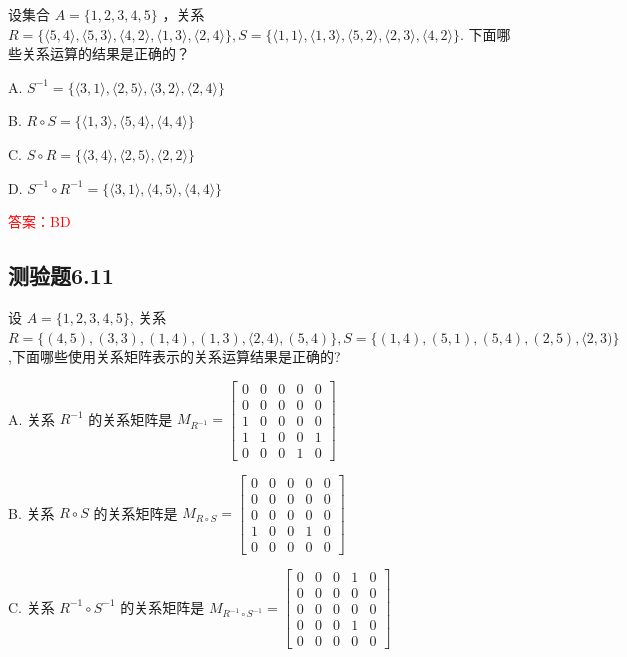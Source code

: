 \documentclass[UTF8, heading=true]{ctexart}
\begin{document}
设集合 $A=\{1,2,3,4,5\}$ ，关系 $R=\{\langle 5,4\rangle,\langle 5,3\rangle,\langle 4,2\rangle,\langle 1,3\rangle,\langle 2,4\rangle\}, S=\{\langle 1,1\rangle,\langle 1,3\rangle,\langle 5,2\rangle,\langle 2,3\rangle,\langle 4,2\rangle\}$.
下面哪些关系运算的结果是正确的？

A. $S^{-1}=\{\langle 3,1\rangle,\langle 2,5\rangle,\langle 3,2\rangle,\langle 2,4\rangle\}$

B. $R \circ S=\{\langle 1,3\rangle,\langle 5,4\rangle,\langle 4,4\rangle\}$

C. $ S \circ R=\{\langle 3,4\rangle,\langle 2,5\rangle,\langle 2,2\rangle\}$

D. $ S^{-1} \circ R^{-1}=\{\langle 3,1\rangle,\langle 4,5\rangle,\langle 4,4\rangle\}$

\textcolor{red}{答案：BD}



\subsection{测验题6.11}

设 $A=\{1,2,3,4,5\}$, 关系 $R=\{(4,5),(3,3),(1,4),(1,3),\langle 2,4),(5,4)\}, S=\{(1,4),(5,1),(5,4),(2,5),\langle 2,3)\}$,下面哪些使用关系矩阵表示的关系运算结果是正确的?

A. 关系 $R^{-1}$ 的关系矩阵是 $M_{R^{-1}}=\left[\begin{array}{lllll}0 & 0 & 0 & 0 & 0 \\ 0 & 0 & 0 & 0 & 0 \\ 1 & 0 & 0 & 0 & 0 \\ 1 & 1 & 0 & 0 & 1 \\ 0 & 0 & 0 & 1 & 0\end{array}\right]$

B. 关系 $R \circ S$ 的关系矩阵是 $M_{R \circ S}=\left[\begin{array}{ccccc}0 & 0 & 0 & 0 & 0 \\ 0 & 0 & 0 & 0 & 0 \\ 0 & 0 & 0 & 0 & 0 \\ 1 & 0 & 0 & 1 & 0 \\ 0 & 0 & 0 & 0 & 0\end{array}\right]$

C. 关系 $R^{-1} \circ S^{-1}$ 的关系矩阵是 $M_{R^{-1} \circ S^{-1}}=\left[\begin{array}{ccccc}0 & 0 & 0 & 1 & 0 \\ 0 & 0 & 0 & 0 & 0 \\ 0 & 0 & 0 & 0 & 0 \\ 0 & 0 & 0 & 1 & 0 \\ 0 & 0 & 0 & 0 & 0\end{array}\right]$
\end{document}
